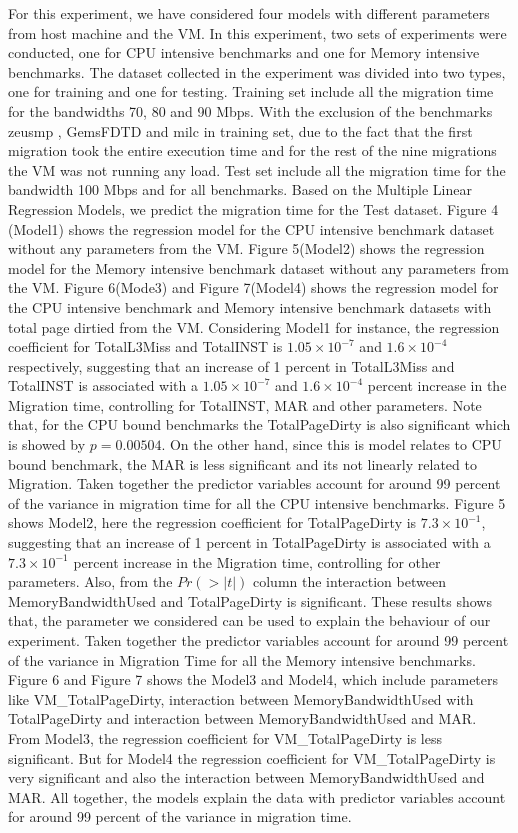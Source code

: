 \documentclass[a4paper,10pt,twoside]{article}
\begin{document}
For this experiment, we have considered four models with different parameters from host machine and the VM. In this experiment, two sets of experiments were conducted, one for CPU intensive benchmarks and one for Memory intensive benchmarks. The dataset collected in the experiment was divided into two types, one for training and one for testing. Training set include all the migration time for the bandwidths 70, 80 and 90 Mbps. With the exclusion of the benchmarks zeusmp , GemsFDTD and milc in training set, due to the fact that the first migration took the entire execution time and for the rest of the nine migrations the VM was not running any load. Test set include all the migration time for the bandwidth 100 Mbps and for all benchmarks. Based on the Multiple Linear Regression Models, we predict the migration time for the Test dataset. Figure 4 (Model1) shows the regression model for the CPU intensive benchmark dataset without any parameters from the VM. Figure 5(Model2) shows the regression model for the Memory intensive benchmark dataset without any parameters from the VM. Figure 6(Mode3) and Figure 7(Model4) shows the regression model for the CPU intensive benchmark and Memory intensive benchmark datasets with total page dirtied from the VM. Considering Model1 for instance, the regression coefficient for TotalL3Miss and TotalINST  is \( 1.05 \times 10^{-7} \) and  \( 1.6 \times 10^{-4} \)  respectively, suggesting that an increase of 1 percent in TotalL3Miss and TotalINST is associated with a \( 1.05 \times 10^{-7} \) and  \( 1.6 \times 10^{-4} \) percent increase in the  Migration time, controlling for TotalINST, MAR and other parameters. Note that, for the CPU bound benchmarks the TotalPageDirty is also significant which is showed by \( p=0.00504 \). On the other hand, since this is model relates to CPU bound benchmark, the MAR is less significant and its not linearly related to Migration. Taken together the predictor variables account for around 99 percent of the variance in migration time for all the CPU intensive benchmarks. 
Figure 5 shows Model2, here the regression coefficient for TotalPageDirty  is \( 7.3  \times 10^{-1} \), suggesting that an increase of 1 percent in TotalPageDirty is associated with a \( 7.3 \times 10^{-1} \) percent increase in the Migration time, controlling for other parameters. Also, from the \(Pr(> |t|)\) column the interaction between MemoryBandwidthUsed and TotalPageDirty is significant. These results shows that, the parameter we considered can be used to explain the behaviour of our experiment. Taken together the predictor variables account for around 99 percent of the variance in Migration Time for all the Memory intensive benchmarks. Figure 6 and Figure 7 shows the Model3 and Model4, which include parameters like VM\_TotalPageDirty, interaction between MemoryBandwidthUsed with TotalPageDirty and interaction between MemoryBandwidthUsed and MAR. From Model3, the regression coefficient for VM\_TotalPageDirty is less significant. But for Model4 the regression coefficient for VM\_TotalPageDirty is very significant and also the interaction between MemoryBandwidthUsed and MAR. All together, the models explain the data with predictor variables account for around 99 percent of the variance in migration time.\\
\end{document}
